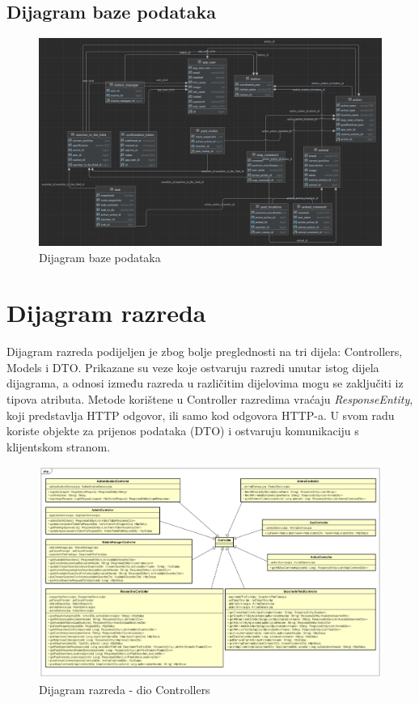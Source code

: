 			\subsection{Dijagram baze podataka}
				\begin{figure}[H]
					\includegraphics[scale=0.6]{dijagrami/dijagramBaza.png}
					\centering
					\caption{Dijagram baze podataka}
					\label{fig:promjene}
				\end{figure}
			\eject
			
			
		\section{Dijagram razreda}
		Dijagram razreda podijeljen je zbog bolje preglednosti na tri dijela: Controllers, Models i DTO. Prikazane su veze koje ostvaruju razredi unutar istog dijela dijagrama, a odnosi između razreda u različitim dijelovima mogu se zaključiti iz tipova atributa. Metode korištene u Controller razredima vraćaju \textit{ResponseEntity}, koji predstavlja HTTP odgovor, ili samo kod odgovora HTTP-a. U svom radu koriste objekte za prijenos podataka (DTO) i ostvaruju komunikaciju s klijentskom stranom.
			
			\begin{figure}[H]
				\includegraphics[scale=0.3]{dijagrami/Controllers.png} 
				\centering
				\caption{Dijagram razreda - dio Controllers}
				\label{fig:promjene}
			\end{figure}
			
